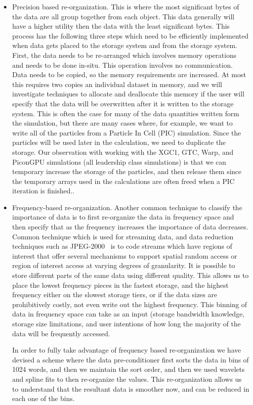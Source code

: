 \begin{itemize}
\item Precision based re-organization. This is where the most significant bytes of the data are
all group together from each object. This data generally will have a higher utility then the data with
the least significant bytes.  This process has the following three steps which need to be
efficiently implemented when data gets placed to the storage system and from the storage 
system. 
%
First, the data needs to be re-arranged which involves memory operations and needs
to be done in-situ. This operation involves no communication.  Data needs to be copied, so
the memory requirements are increased. At most this requires two copies an individual dataset
in memory, and we will investigate techniques to allocate and deallocate this memory if the user
will specify that the data will be overwritten after it is written to the storage system. This is often
the case for many of the data quantities written form the simulation, but there are many cases
where, for example, we want to write all of the particles from a Particle In Cell (PIC) simulation. 
Since the particles will be used later in the calculation, we need to duplicate the storage. Our
observation with working with the XGC1, GTC, Warp, and PiconGPU simulations (all leadership
class simulations) is that we can temporary increase the storage of the particles, and then 
release them since the temporary arrays used in the calculations are often freed when a PIC
iteration is finished.. 
%
\item Frequency-based re-organization. 
Another common technique to classify the importance of data is to first re-organize the data
in frequency space and then specify that as the frequency increases the importance of data
decreases.   Common technique which is used for streaming data, and data reduction techniques such as JPEG-2000~\cite{jpeg2000}
is to  code streams which have regions of interest that offer several mechanisms to support spatial random access or region of interest access at varying degrees of granularity. It is possible to store different parts of the same data using different quality.
%
This allows us to place the lowest frequency pieces in the fastest storage, and
the highest frequency either on the slowest storage tiers, or if the data sizes are prohibitively  
costly, not even write out the highest frequency. This binning of data in frequency space can
take as an input (storage bandwidth knowledge, storage size limitations, and user intentions
of how long the majority of the data will be frequently accessed. 

In order to fully take advantage of frequency based re-organization we have devised a scheme where the data pre-conditioner first sorts the data
in bins of 1024 words, and then we maintain the sort order, and then we used wavelets and spline fits to then re-organize the values.
This re-organization allows us to understand that the resultant data is smoother now, and can be reduced in each one of the bins.
\end{itemize}

